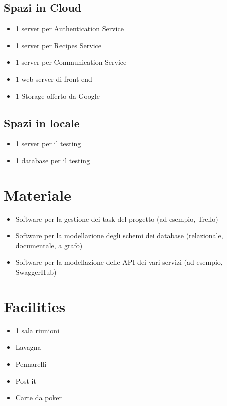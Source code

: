 \documentclass{article}
\begin{document}
\subsection{Spazi in Cloud}
\begin{itemize}
    \item 1 server per Authentication Service
    \item 1 server per Recipes Service
    \item 1 server per Communication Service
    \item 1 web server di front-end
    \item 1 Storage offerto da Google
\end{itemize}

\subsection{Spazi in locale}
\begin{itemize}
    \item 1 server per il testing
    \item 1 database per il testing
\end{itemize}


\section{Materiale}
\begin{itemize}
    \item Software per la gestione dei task del progetto (ad esempio, Trello)
    \item Software per la modellazione degli schemi dei database (relazionale, documentale, a grafo)
    \item Software per la modellazione delle API dei vari servizi (ad esempio, SwaggerHub)
\end{itemize}


\section{Facilities}
\begin{itemize}
    \item 1 sala riunioni
    \item Lavagna
    \item Pennarelli
    \item Post-it
    \item Carte da poker
\end{itemize}
\end{document}
